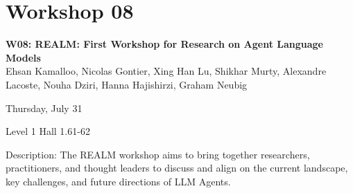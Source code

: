 \clearpage



\section[W08: REALM: First Workshop for Research on Agent Language Models]{Workshop 08}
\label{workshop_8}

\begin{center}
    {\Large \textbf{W08: REALM: First Workshop for Research on Agent Language Models}}\\

    Ehsan Kamalloo, Nicolas Gontier, Xing Han Lu, Shikhar Murty, Alexandre Lacoste, Nouha Dziri, Hanna Hajishirzi, Graham Neubig

    Thursday, July 31
    
    Level 1 Hall 1.61-62

\end{center}

Description: The REALM workshop aims to bring together researchers, practitioners, and thought leaders to discuss and align on the current landscape, key challenges, and future directions of LLM Agents.


